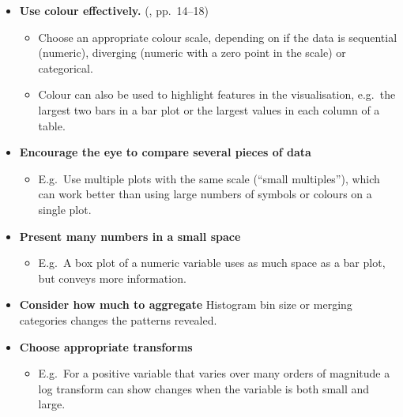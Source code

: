 \documentclass[10pt]{article}
\begin{document}
\begin{multicols}{3}
{\begin{itemize}[itemsep=1ex]
  clearer in graphics than tables. However, tables are a form of
  visualisation, and good for conveying raw data or dealing with large
  numbers of variables.
\item \textbf{Use colour effectively.} (\citealp{WexlEtal17big}, pp.~14--18)
  \begin{itemize}
  \item Choose an appropriate colour scale, depending on if the data
    is sequential (numeric), diverging (numeric with a zero point in
    the scale) or categorical.
  \item Colour can also be used to highlight features in the visualisation,
    e.g.~the largest two bars in a bar plot or the largest values in
    each column of a table.
  \end{itemize}
\item \textbf{Encourage the eye to compare several pieces of data}
  \begin{itemize}
  \item E.g.~Use multiple plots with the same scale (``small
    multiples''), which can work better than using large numbers of
    symbols or colours on a single plot.
  \end{itemize}
\item \textbf{Present many numbers in a small space}
  \begin{itemize}
  \item E.g.~A box plot of a numeric variable uses as much space as a
    bar plot, but conveys more information.
  \end{itemize}
\item \textbf{Consider how much to aggregate} Histogram bin size or
  merging categories changes the patterns revealed.
\item \textbf{Choose appropriate transforms}
  \begin{itemize}
  \item E.g.~For a positive variable that varies over many orders of
    magnitude %
    a log transform can show changes when the variable is both small
    and large.
  \end{itemize}
\end{itemize}
}


\end{multicols}
\end{document}
